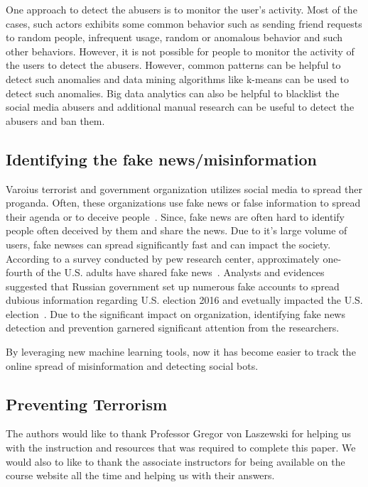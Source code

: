 \documentclass[sigconf]{acmart}
\begin{document}
One approach to detect the abusers is to monitor the user's activity. Most of the cases, such actors exhibits some common behavior such as sending friend requests to random people, infrequent usage, random or anomalous behavior and such other behaviors. However, it is not possible for people to monitor the activity of the users to detect the abusers. However, common patterns can be helpful to detect such anomalies and data mining algorithms like k-means can be used to detect such anomalies. Big data analytics can also be helpful to blacklist the social media abusers and additional manual research can be useful to detect the abusers and ban them. 


\subsection{Identifying the fake news/misinformation }
Varoius terrorist and government organization utilizes social media to spread ther proganda. Often, these organizations use fake news or false information to spread their agenda or to deceive people~\cite{Aymanns:2017}.  Since, fake news are often hard to identify people often deceived by them and share the news. Due to it's large volume of users, fake newses can spread significantly fast and can impact the society. According to a survey conducted by pew research center, approximately one-fourth of the U.S. adults have shared fake news~\cite{fake2}. Analysts and evidences suggested that Russian government  set up numerous fake accounts to spread dubious information regarding U.S. election 2016 and evetually impacted the U.S. election~\cite{fake2,Allcott:2017}.  Due to the significant impact on organization, identifying fake news detection and prevention garnered significant attention from  the researchers.

By leveraging new machine learning tools, now it has become easier to track the online spread of misinformation and detecting social bots. 



\subsection{Preventing Terrorism}




\begin{acks}

The authors would like to thank Professor Gregor von Laszewski for helping us with the instruction and resources that was required to complete this paper. We would also to like to thank the associate instructors for being available on the course website all the time and helping us with their answers.

\end{acks}
\end{document}
